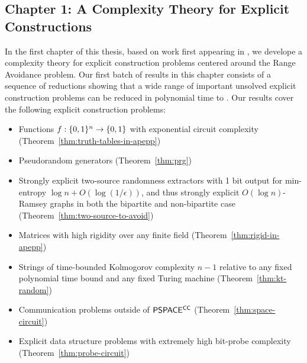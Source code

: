 \subsection{Chapter 1: A Complexity Theory for Explicit Constructions}
In the first chapter of this thesis, based on work first appearing in \cite{Korten}, we develope a complexity theory for explicit construction problems centered around the Range Avoidance problem. Our first batch of results in this chapter consists of a sequence of reductions showing that a wide range of important unsolved explicit construction problems can be reduced in polynomial time to \avoid. Our results cover the following explicit construction problems:
\begin{itemize}
    \item Functions $f: \{0,1\}^n \to \{0,1\}$ with exponential circuit complexity (Theorem~\ref{thm:truth-tables-in-apepp})
    \item Pseudorandom generators (Theorem~\ref{thm:prg})
    \item Strongly explicit two-source randomness extractors with 1 bit output for min-entropy $\log n + O(\log(1/\epsilon))$, and thus strongly explicit $O(\log n)$-Ramsey graphs in both the bipartite and non-bipartite case (Theorem~\ref{thm:two-source-to-avoid})
    \item Matrices with high rigidity over any finite field (Theorem~\ref{thm:rigid-in-apepp})
    \item Strings of time-bounded Kolmogorov complexity $n - 1$ relative to any fixed polynomial time bound and any fixed Turing machine (Theorem~\ref{thm:kt-random})
    \item Communication problems outside of $\cl{PSPACE^{CC}}$ (Theorem~\ref{thm:space-circuit})
    \item Explicit data structure problems with extremely high bit-probe complexity (Theorem~\ref{thm:probe-circuit})
\end{itemize}

